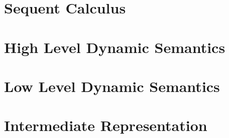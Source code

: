 \chapter{Sequent Calculus}\label{sec:fragment}


\chapter{High Level Dynamic Semantics}\label{sec:hld}


\chapter{Low Level Dynamic Semantics}\label{sec:lld}


\chapter{Intermediate Representation}\label{appendix:vm}

